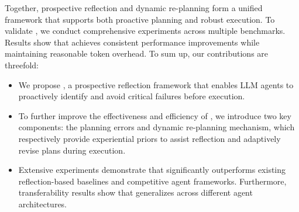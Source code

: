 Together, prospective reflection and dynamic re-planning form a unified framework that supports both proactive planning and robust execution.
To validate \method, we conduct comprehensive experiments across multiple benchmarks. Results show that \method achieves consistent performance improvements while maintaining reasonable token overhead. To sum up, our contributions are threefold:
 

 

 

\vspace{-15pt}
\begin{itemize}
\setlength{\itemsep}{-2pt}
    \item We propose \method, a prospective reflection framework that enables LLM agents to proactively identify and avoid critical failures before execution.
    \item To further improve the effectiveness and efficiency of \method, we introduce two key components: the planning errors and  dynamic re-planning mechanism, which respectively provide experiential priors to assist reflection and adaptively revise plans during execution.
    \item Extensive experiments demonstrate that \method significantly outperforms existing reflection-based baselines and competitive agent frameworks. Furthermore, transferability results show that \method generalizes across different agent architectures.
\end{itemize}
\vspace{-15pt}
